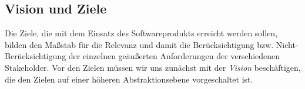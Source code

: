 \subsection{Vision und Ziele}
\label{sec:Kap-6.1.2}

Die Ziele, die mit dem Einsatz des Softwareprodukts erreicht werden sollen, bilden den Maßstab für die Relevanz und damit die Berücksichtigung bzw. Nicht-Berücksichtigung der einzelnen geäußerten Anforderungen der verschiedenen Stakeholder. Vor den Zielen müssen wir uns zunächst mit der \textit{Vision} beschäftigen, die den Zielen auf einer höheren Abstraktionsebene vorgeschaltet ist.